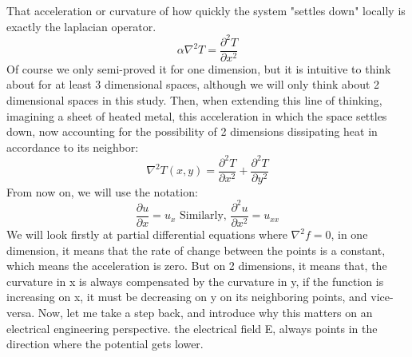 \documentclass[12pt]{article}
\begin{document}
That acceleration or curvature of how quickly the system "settles down" locally is exactly the laplacian operator.
\[\alpha\nabla^2T=\frac{\partial^2T}{\partial x^2}\]
Of course we only semi-proved it for one dimension, but it is intuitive to think about for at least 3 dimensional spaces, although we will only think about 2 dimensional spaces in this study.
Then, when extending this line of thinking, imagining a sheet of heated metal, this acceleration in which the space settles down, now accounting for the possibility of 2 dimensions dissipating heat in accordance to its neighbor:
\[\nabla ^2 T(x,y)=\frac{\partial^2T}{\partial x^2}+\frac{\partial^2T}{\partial y^2}\]
From now on, we will use the notation:
\[\frac{\partial u}{\partial x}=u_{x}\text { Similarly, } \frac{\partial^2u }{\partial x^2}=u_{xx}\]
We will look firstly at partial differential equations where \(\nabla^2f=0\), in one dimension, it means that the rate of change between the points is a constant, which means the acceleration is zero. 
But on 2 dimensions, it means that, the curvature in x is always compensated by the curvature in y, if the function is increasing on x, it must be decreasing on y on its neighboring points, and vice-versa.
Now, let me take a step back, and introduce why this matters on an electrical engineering perspective. the electrical field E, always points in the direction where the potential gets lower.
\begin{center}

\end{center}
\end{document}
